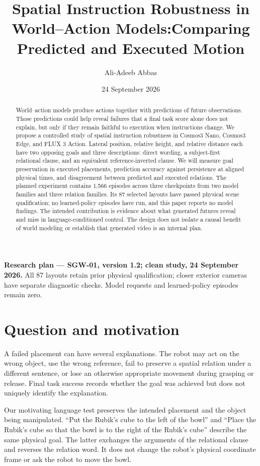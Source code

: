 \documentclass[11pt]{article}
\title{Spatial Instruction Robustness in World--Action Models:\newline Comparing Predicted and Executed Motion}
\author{Ali-Adeeb Abbas}
\date{24 September 2026}
\newcommand{\status}{\textbf{Research plan --- SGW-01, version 1.2; clean study, 24 September 2026.} All 87 layouts retain prior physical qualification; closer exterior cameras have separate diagnostic checks. Model requests and learned-policy episodes remain zero.}
\begin{document}
\maketitle
\begin{center}\small\color{ink}\status\end{center}

\begin{abstract}
World--action models produce actions together with predictions of future observations. Those predictions could help reveal failures that a final task score alone does not explain, but only if they remain faithful to execution when instructions change. We propose a controlled study of spatial instruction robustness in Cosmos3 Nano, Cosmos3 Edge, and FLUX 3 Action. Lateral position, relative height, and relative distance each have two opposing goals and three descriptions: direct wording, a subject-first relational clause, and an equivalent reference-inverted clause. We will measure goal preservation in executed placements, prediction accuracy against persistence at aligned physical times, and disagreement between predicted and executed relations. The planned experiment contains 1,566 episodes across three checkpoints from two model families and three relation families. Its 87 selected layouts have passed physical scene qualification; no learned-policy episodes have run, and this paper reports no model findings. The intended contribution is evidence about what generated futures reveal and miss in language-conditioned control. The design does not isolate a causal benefit of world modeling or establish that generated video is an internal plan.
\end{abstract}

\section{Question and motivation}
A failed placement can have several explanations. The robot may act on the wrong object, use the wrong reference, fail to preserve a spatial relation under a different sentence, or lose an otherwise appropriate movement during grasping or release. Final task success records whether the goal was achieved but does not uniquely identify the explanation.

Our motivating language test preserves the intended placement and the object being manipulated. ``Put the Rubik's cube to the left of the bowl'' and ``Place the Rubik's cube so that the bowl is to the right of the Rubik's cube'' describe the same physical goal. The latter exchanges the arguments of the relational clause and reverses the relation word. It does not change the robot's physical coordinate frame or ask the robot to move the bowl.
\end{document}
